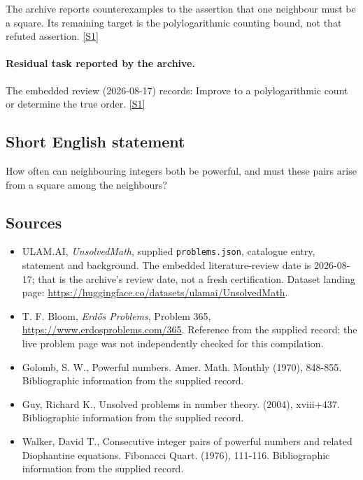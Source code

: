 \documentclass[11pt,a4paper]{article}
\newcommand{\sref}[2]{\hyperlink{source:#1:#2}{[S#2]}}
\begin{document}
The archive reports counterexamples to the assertion that one neighbour must be a square. Its remaining target is the polylogarithmic counting bound, not that refuted assertion. \sref{statement}{1}

\paragraph{Residual task reported by the archive.}

The embedded review (2026-08-17) records: Improve to a polylogarithmic count or determine the true order. \sref{statement}{1}

\subsection{Short English statement}

How often can neighbouring integers both be powerful, and must these pairs arise from a square among the neighbours?

\subsection{Sources}

{\small

\begin{itemize}

\item[\hypertarget{source:statement:1}{S1}] ULAM.AI, \emph{UnsolvedMath}, supplied \texttt{problems.json}, catalogue entry, statement and background. The embedded literature-review date is 2026-08-17; that is the archive’s review date, not a fresh certification. Dataset landing page: \url{https://huggingface.co/datasets/ulamai/UnsolvedMath}.

\item[\hypertarget{source:statement:2}{S2}] T. F. Bloom, \emph{Erdős Problems}, Problem 365, \url{https://www.erdosproblems.com/365}. Reference from the supplied record; the live problem page was not independently checked for this compilation.

\item[\hypertarget{source:statement:3}{S3}] Golomb, S. W., Powerful numbers. Amer. Math. Monthly (1970), 848-855. Bibliographic information from the supplied record.

\item[\hypertarget{source:statement:4}{S4}] Guy, Richard K., Unsolved problems in number theory. (2004), xviii+437. Bibliographic information from the supplied record.

\item[\hypertarget{source:statement:5}{S5}] Walker, David T., Consecutive integer pairs of powerful numbers and related Diophantine equations. Fibonacci Quart. (1976), 111-116. Bibliographic information from the supplied record.

\end{itemize}

}

\label{end:statement}
\end{document}

